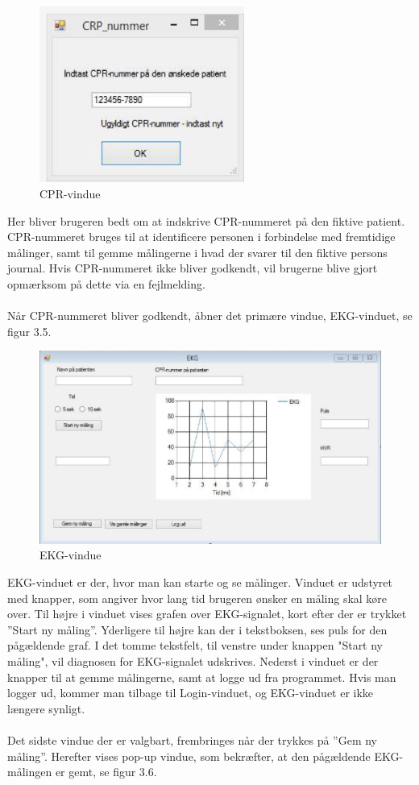 \begin{figure}[H]
	\centering
	\includegraphics[width=0.6\textwidth]{Figurer/Snip20150430_39}
	\caption{CPR-vindue}
\end{figure} 

Her bliver brugeren bedt om at indskrive CPR-nummeret på den fiktive patient. CPR-nummeret bruges til at identificere personen i forbindelse med fremtidige målinger, samt til gemme målingerne i hvad der svarer til den fiktive persons journal. Hvis CPR-nummeret ikke bliver godkendt, vil brugerne blive gjort opmærksom på dette via en fejlmelding. 
\\
\\
Når CPR-nummeret bliver godkendt, åbner det primære vindue, EKG-vinduet, se figur 3.5. 

\begin{figure}[H]
	\centering
	\includegraphics[width=1\textwidth]{Figurer/Snip20150430_40}
	\caption{EKG-vindue}
\end{figure}

EKG-vinduet er der, hvor man kan starte og se målinger. Vinduet er udstyret med knapper, som angiver hvor lang tid brugeren ønsker en måling skal køre over. Til højre i vinduet vises grafen over EKG-signalet, kort efter der er trykket ”Start ny måling”. Yderligere til højre kan der i tekstboksen, ses puls for den pågældende graf. I det tomme tekstfelt, til venstre under knappen "Start ny måling", vil diagnosen for EKG-signalet udskrives. Nederst i vinduet er der knapper til at gemme målingerne, samt at logge ud fra programmet. Hvis man logger ud, kommer man tilbage til Login-vinduet, og EKG-vinduet er ikke længere synligt. 
\\
\\
Det sidste vindue der er valgbart, frembringes når der trykkes på ”Gem ny måling”. Herefter vises pop-up vindue, som bekræfter, at den pågældende EKG-målingen er gemt, se figur 3.6. 

